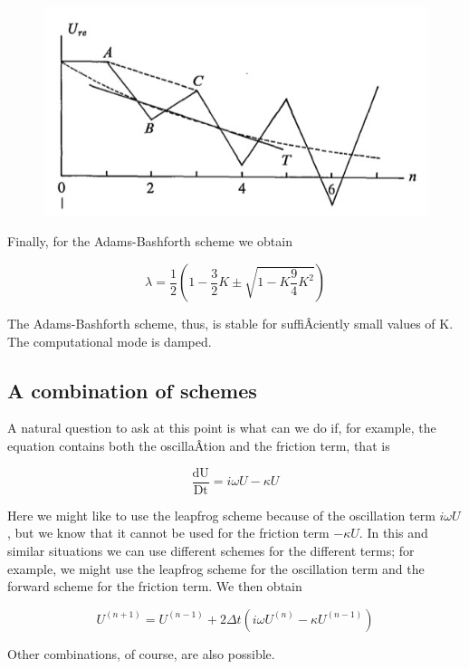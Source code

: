 \begin{figure}
    \centering
    \includegraphics[width = .7 \textwidth]{figs/NM/pic10.jpg}
    \caption{} \label{fig:}
\end{figure}

Finally, for the Adams-Bashforth scheme we obtain

\[\lambda = \frac{1}{2}\left( 1 - \frac{3}{2}K \pm \sqrt{1 - K\frac{9}{4}K^{2}} \right)\]

The Adams-Bashforth scheme, thus, is stable for suffiÂ­ciently small
values of K. The computational mode is damped.

\subsection{\texorpdfstring{\textbf{A combination of
schemes}}{A combination of schemes}}\label{a-combination-of-schemes}

A natural question to ask at this point is what can we do if, for
example, the equation contains both the oscillaÂ­tion and the friction
term, that is

\[\frac{\text{dU}}{\text{Dt}} = i\omega U - \kappa U\]

Here we might like to use the leapfrog scheme because of the oscillation
term \(i\omega U\), but we know that it cannot be used for the friction
term \(- \kappa U\). In this and similar situations we can use different
schemes for the different terms; for example, we might use the leapfrog
scheme for the oscillation term and the forward scheme for the friction
term. We then obtain

\[U^{\left( n + 1 \right)} = U^{\left( n - 1 \right)} + 2\Delta t\left( i\omega U^{\left( n \right)} - \kappa U^{\left( n - 1 \right)} \right)\]

Other combinations, of course, are also possible.